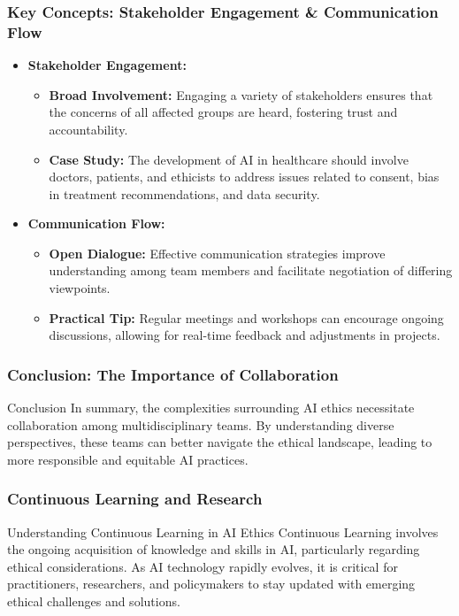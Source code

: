 \documentclass[aspectratio=169]{beamer}
\begin{document}
\begin{frame}[fragile]
    \frametitle{Key Concepts: Stakeholder Engagement & Communication Flow}
    \begin{itemize}
        \item \textbf{Stakeholder Engagement:}
        \begin{itemize}
            \item \textbf{Broad Involvement:} Engaging a variety of stakeholders ensures that the concerns of all affected groups are heard, fostering trust and accountability.
            \item \textbf{Case Study:} The development of AI in healthcare should involve doctors, patients, and ethicists to address issues related to consent, bias in treatment recommendations, and data security.
        \end{itemize}
        \item \textbf{Communication Flow:}
        \begin{itemize}
            \item \textbf{Open Dialogue:} Effective communication strategies improve understanding among team members and facilitate negotiation of differing viewpoints.
            \item \textbf{Practical Tip:} Regular meetings and workshops can encourage ongoing discussions, allowing for real-time feedback and adjustments in projects.
        \end{itemize}
    \end{itemize}
\end{frame}

\begin{frame}[fragile]
    \frametitle{Conclusion: The Importance of Collaboration}
    \begin{block}{Conclusion}
        In summary, the complexities surrounding AI ethics necessitate collaboration among multidisciplinary teams. By understanding diverse perspectives, these teams can better navigate the ethical landscape, leading to more responsible and equitable AI practices. 
    \end{block}
\end{frame}

\begin{frame}[fragile]
    \frametitle{Continuous Learning and Research}
    \begin{block}{Understanding Continuous Learning in AI Ethics}
        Continuous Learning involves the ongoing acquisition of knowledge and skills in AI, particularly regarding ethical considerations. As AI technology rapidly evolves, it is critical for practitioners, researchers, and policymakers to stay updated with emerging ethical challenges and solutions.
    \end{block}
\end{frame}
\end{document}
